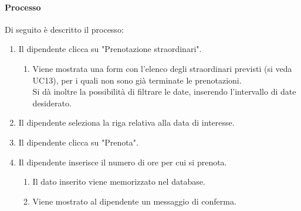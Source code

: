\paragraph{Processo}
Di seguito è descritto il processo:
\begin{enumerate}
	\item Il dipendente clicca su "Prenotazione straordinari".
		\begin{enumerate}
			\item Viene mostrata una form con l'elenco degli straordinari previsti (si veda UC13), per i quali non sono già terminate le prenotazioni.\\
				Si dà inoltre la possibilità di filtrare le date, inserendo l'intervallo di date desiderato.
		\end{enumerate}
	\item Il dipendente seleziona la riga relativa alla data di interesse.
	\item Il dipendente clicca su "Prenota".
	\item Il dipendente inserisce il numero di ore per cui si prenota.
		\begin{enumerate}
			\item Il dato inserito viene memorizzato nel database.
			\item Viene mostrato al dipendente un messaggio di conferma.
		\end{enumerate}
\end{enumerate}
